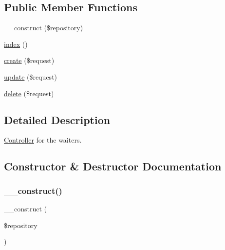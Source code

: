 \subsection*{Public Member Functions}
\begin{DoxyCompactItemize}
\item 
\mbox{\hyperlink{class_app_1_1_http_1_1_controllers_1_1_waiter_controller_a5b75ba6bc9debb999c0186a31978ec03}{\+\_\+\+\_\+construct}} (\$repository)
\item 
\mbox{\hyperlink{class_app_1_1_http_1_1_controllers_1_1_waiter_controller_a149eb92716c1084a935e04a8d95f7347}{index}} ()
\item 
\mbox{\hyperlink{class_app_1_1_http_1_1_controllers_1_1_waiter_controller_a4fa811c83f27da01b0d92bdb2a711a13}{create}} (\$request)
\item 
\mbox{\hyperlink{class_app_1_1_http_1_1_controllers_1_1_waiter_controller_ab7b27a90191560dcef32126b0945db0d}{update}} (\$request)
\item 
\mbox{\hyperlink{class_app_1_1_http_1_1_controllers_1_1_waiter_controller_a126a3799c44d72393ca4732081306dfd}{delete}} (\$request)
\end{DoxyCompactItemize}


\subsection{Detailed Description}
\mbox{\hyperlink{class_app_1_1_http_1_1_controllers_1_1_controller}{Controller}} for the waiters. 

\subsection{Constructor \& Destructor Documentation}
\mbox{\label{class_app_1_1_http_1_1_controllers_1_1_waiter_controller_a5b75ba6bc9debb999c0186a31978ec03}} 
\subsubsection{\texorpdfstring{\+\_\+\+\_\+construct()}{\_\_construct()}}
{\footnotesize\ttfamily \+\_\+\+\_\+construct (\begin{DoxyParamCaption}\item[{}]{\$repository }\end{DoxyParamCaption})}

